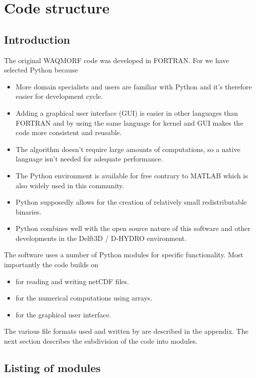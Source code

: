 \chapter{Code structure}

\section{Introduction}

The original WAQMORF code was developed in FORTRAN.
For \dfastmi we have selected Python because

\begin{itemize}
\item More domain specialists and users are familiar with Python and it's therefore easier for development cycle.
\item Adding a graphical user interface (GUI) is easier in other languages than FORTRAN and by using the same language for kernel and GUI makes the code more consistent and reusable.
\item The algorithm doesn't require large amounts of computations, so a native language isn't needed for adequate performance.
\item The Python environment is available for free contrary to MATLAB which is also widely used in this community.
\item Python supposedly allows for the creation of relatively small redistributable binaries.
\item Python combines well with the open source nature of this software and other developments in the Delft3D / D-HYDRO environment.
\end{itemize}

The software uses a number of Python modules for specific functionality.
Most importantly the code builds on

\begin{itemize}
\item {} for reading and writing netCDF files.
\item {} for the numerical computations using arrays.
\item {} for the graphical user interface.
\end{itemize}

The various file formats used and written by \dfastmi are described in the appendix.
The next section describes the subdivision of the code into modules.

\section{Listing of modules}

